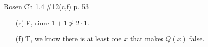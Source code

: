 \documentclass[12pt,addpoints]{exam}
\begin{document}
\begin{questions}
\question Rosen Ch 1.4 \#12(c,f) p. 53
    \begin{solution}
    \begin{itemize}
        \item[(c)] F, since $1 + 1 \ngtr 2\cdot 1$.
        \item[(f)] T, we know there is at least one $x$ that makes $Q(x)$ false.
    \end{itemize}
    \end{solution}


\end{questions}
\end{document}
